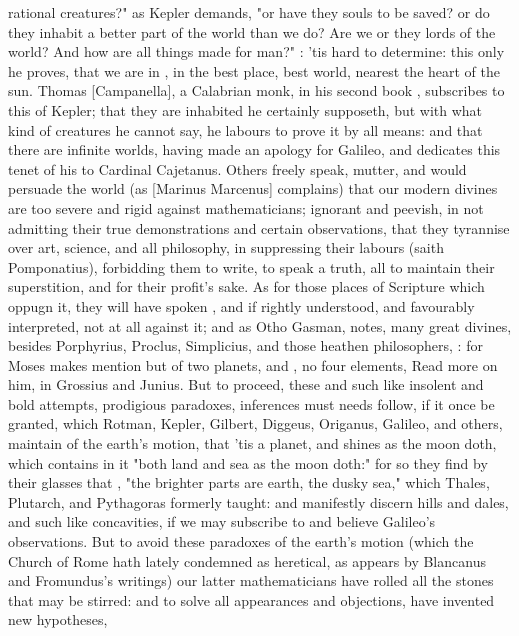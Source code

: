 {rational creatures?" as Kepler demands, "or have they souls to be saved? or do they inhabit a better part of the world than we do? Are we or they lords of the world? And how are all things made for man?" : 'tis hard to determine: this only he proves, that we are in , in the best place, best world, nearest the heart of the sun. Thomas [Campanella], a Calabrian monk, in his second book , subscribes to this of Kepler; that they are inhabited he certainly supposeth, but with what kind of creatures he cannot say, he labours to prove it by all means: and that there are infinite worlds, having made an apology for Galileo, and dedicates this tenet of his to Cardinal Cajetanus. Others freely speak, mutter, and would persuade the world (as [Marinus Marcenus] complains) that our modern divines are too severe and rigid against mathematicians; ignorant and peevish, in not admitting their true demonstrations and certain observations, that they tyrannise over art, science, and all philosophy, in suppressing their labours (saith Pomponatius), forbidding them to write, to speak a truth, all to maintain their superstition, and for their profit's sake. As for those places of Scripture which oppugn it, they will have spoken , and if rightly understood, and favourably interpreted, not at all against it; and as Otho Gasman,  notes, many great divines, besides Porphyrius, Proclus, Simplicius, and those heathen philosophers, : for Moses makes mention but of two planets,  and , no four elements, \etc{} Read more on him, in Grossius and Junius. But to proceed, these and such like insolent and bold attempts, prodigious paradoxes, inferences must needs follow, if it once be granted, which Rotman, Kepler, Gilbert, Diggeus, Origanus, Galileo, and others, maintain of the earth's motion, that 'tis a planet, and shines as the moon doth, which contains in it "both land and sea as the moon doth:" for so they find by their glasses that , "the brighter parts are earth, the dusky sea," which Thales, Plutarch, and Pythagoras formerly taught: and manifestly discern hills and dales, and such like concavities, if we may subscribe to and believe Galileo's observations. But to avoid these paradoxes of the earth's motion (which the Church of Rome hath lately condemned as heretical, as appears by Blancanus and Fromundus's writings) our latter mathematicians have rolled all the stones that may be stirred: and to solve all appearances and objections, have invented new hypotheses, }
